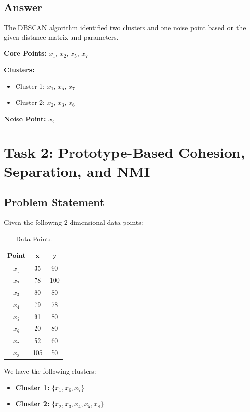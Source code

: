 \documentclass{article}
\begin{document}
\subsection*{Answer}

The DBSCAN algorithm identified two clusters and one noise point based on the given distance matrix and parameters.

\vspace{1em}

\textbf{Core Points:} $x_1$, $x_2$, $x_5$, $x_7$

\textbf{Clusters:}
\begin{itemize}
    \item Cluster 1: $x_1$, $x_5$, $x_7$
    \item Cluster 2: $x_2$, $x_3$, $x_6$
\end{itemize}

\textbf{Noise Point:} $x_4$

\section*{Task 2: Prototype-Based Cohesion, Separation, and NMI}

\subsection*{Problem Statement}

Given the following 2-dimensional data points:

\begin{table}[H]
\centering
\caption{Data Points}
\begin{tabular}{c|cc}
\toprule
\textbf{Point} & \textbf{x} & \textbf{y} \\
\midrule
$x_1$ & 35 & 90 \\
$x_2$ & 78 & 100 \\
$x_3$ & 80 & 80 \\
$x_4$ & 79 & 78 \\
$x_5$ & 91 & 80 \\
$x_6$ & 20 & 80 \\
$x_7$ & 52 & 60 \\
$x_8$ & 105 & 50 \\
\bottomrule
\end{tabular}
\end{table}

We have the following clusters:

\begin{itemize}
    \item \textbf{Cluster 1:} $\{ x_1, x_6, x_7 \}$
    \item \textbf{Cluster 2:} $\{ x_2, x_3, x_4, x_5, x_8 \}$
\end{itemize}
\end{document}
